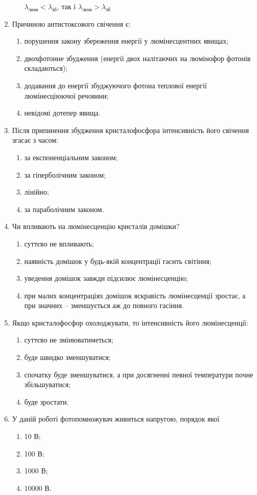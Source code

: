 \documentclass[twocolumn]{el-author}
\begin{document}
\begin{enumerate}
\begin{enumerate}
		$\lambda_{люм} < \lambda_{зб}$, так і $\lambda_{люм} > \lambda_{зб}$
	\end{enumerate}
	\item Причиною антистоксового свічення є:
	\begin{enumerate}
		\item  порушення закону збереження енергії у люмінесцентних явищах;
		\item двохфотонне збудження (енергії двох налітаючих на люмінофор фотонів
складаються);
		\item додавання до енергії  збуджуючого фотона теплової енергії
люмінесціюючої речовини;
		\item невідомі дотепер явища.
	\end{enumerate}
	\item Після припинення збудження кристалофосфора інтенсивність його
свічення згасає з часом:
	\begin{enumerate}
		\item за експоненціальним законом;
		\item за гіперболічним законом;
		\item лінійно;
		\item за параболічним законом.
	\end{enumerate}
	\item  Чи впливають на люмінесценцію кристалів домішки?
	\begin{enumerate}
		\item суттєво не впливають;
		\item наявність домішок у будь-якій концентрації гасить світіння;
		\item уведення домішок завжди підсилює люмінесценцію;
		\item при малих концентраціях домішок яскравість люмінесценції зростає, а
при значних -- зменшується аж до повного гасіння.
	\end{enumerate}
	\item Якщо кристалофосфор охолоджувати, то інтенсивність його
люмінесценції:
	\begin{enumerate}
		\item суттєво не змінюватиметься;
		\item буде швидко зменшуватися;
		\item спочатку буде зменшуватися, а при досягненні певної температури
почне збільшуватися;
		\item буде зростати.
	\end{enumerate}
	\item У даній роботі фотопомножувач живиться напругою, порядок якої
	\begin{enumerate}
		\item 10 В;
		\item 100 В;
		\item 1000 В;
		\item 10000 В.
	\end{enumerate}
\end{enumerate}
\end{document}

